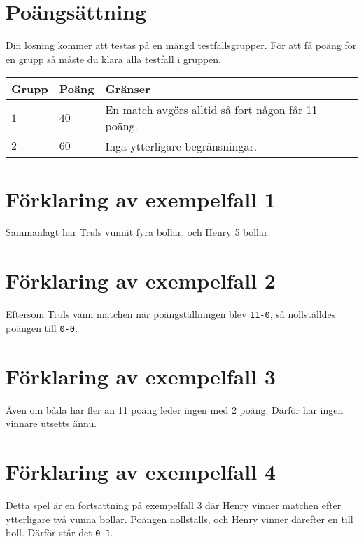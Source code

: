 \section*{Poängsättning}
Din lösning kommer att testas på en mängd testfallsgrupper.
För att få poäng för en grupp så måste du klara alla testfall i gruppen.

\noindent
\begin{tabular}{| l | l | p{12cm} |}
  \hline
  \textbf{Grupp} & \textbf{Poäng} & \textbf{Gränser} \\ \hline
  $1$    & $40$       & En match avgörs alltid så fort någon får 11 poäng. \\ \hline
  $2$    & $60$       & Inga ytterligare begränsningar. \\ \hline
\end{tabular}


\section*{Förklaring av exempelfall 1}
Sammanlagt har Truls vunnit fyra bollar, och Henry 5 bollar.

\section*{Förklaring av exempelfall 2}
Eftersom Truls vann matchen när poängställningen blev \texttt{11-0}, så nollställdes poängen till \texttt{0-0}.

\section*{Förklaring av exempelfall 3}
Även om båda har fler än 11 poäng leder ingen med 2 poäng. Därför har ingen vinnare utsetts ännu.

\section*{Förklaring av exempelfall 4}
Detta spel är en fortsättning på exempelfall 3 där Henry vinner matchen efter ytterligare två vunna bollar. 
Poängen nollställs, och Henry vinner därefter en till boll. Därför står det \texttt{0-1}.